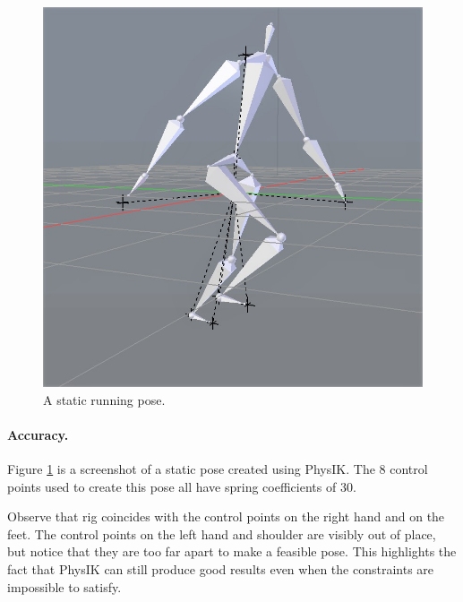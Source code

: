 \documentclass[10pt,twocolumn,letterpaper]{article}
\begin{document}
\begin{figure}[]
    \centering
    \includegraphics[width=0.7\columnwidth] {pose-frame.jpg}
    \caption{A static running pose.}
    \label{img:running}
\end{figure}

\paragraph{Accuracy.} Figure \ref{img:running} is a screenshot of a static pose created using PhysIK. The 8 control points used to create this pose all have spring coefficients of 30.

Observe that rig coincides with the control points on the right hand and on the feet. The control points on the left hand and shoulder are visibly out of place, but notice that they are too far apart to make a feasible pose. This highlights the fact that PhysIK can still produce good results even when the constraints are impossible to satisfy. 
\end{document}
